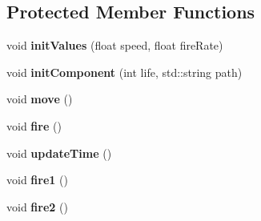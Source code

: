 \subsection*{Protected Member Functions}
\begin{DoxyCompactItemize}
\item 
\hypertarget{class_player_a404b1d420a802000bdca0ac07f463c9b}{}\label{class_player_a404b1d420a802000bdca0ac07f463c9b} 
void {\bfseries init\+Values} (float speed, float fire\+Rate)
\item 
\hypertarget{class_player_a505efa3aa6fa4e21a84200399cc90f4d}{}\label{class_player_a505efa3aa6fa4e21a84200399cc90f4d} 
void {\bfseries init\+Component} (int life, std\+::string path)
\item 
\hypertarget{class_player_ae02ee46d8c20dd0697b975f935b09839}{}\label{class_player_ae02ee46d8c20dd0697b975f935b09839} 
void {\bfseries move} ()
\item 
\hypertarget{class_player_a5dc98bda088b0e253956ef22eba154f0}{}\label{class_player_a5dc98bda088b0e253956ef22eba154f0} 
void {\bfseries fire} ()
\item 
\hypertarget{class_player_ac4c7b097b1e703f026c80a1142648fbd}{}\label{class_player_ac4c7b097b1e703f026c80a1142648fbd} 
void {\bfseries update\+Time} ()
\item 
\hypertarget{class_player_ae4b66b26311d3a7f2fe5b35edfe6e97a}{}\label{class_player_ae4b66b26311d3a7f2fe5b35edfe6e97a} 
void {\bfseries fire1} ()
\item 
\hypertarget{class_player_ad03f605930d87fecefaf5f07972c8514}{}\label{class_player_ad03f605930d87fecefaf5f07972c8514} 
void {\bfseries fire2} ()
\end{DoxyCompactItemize}
